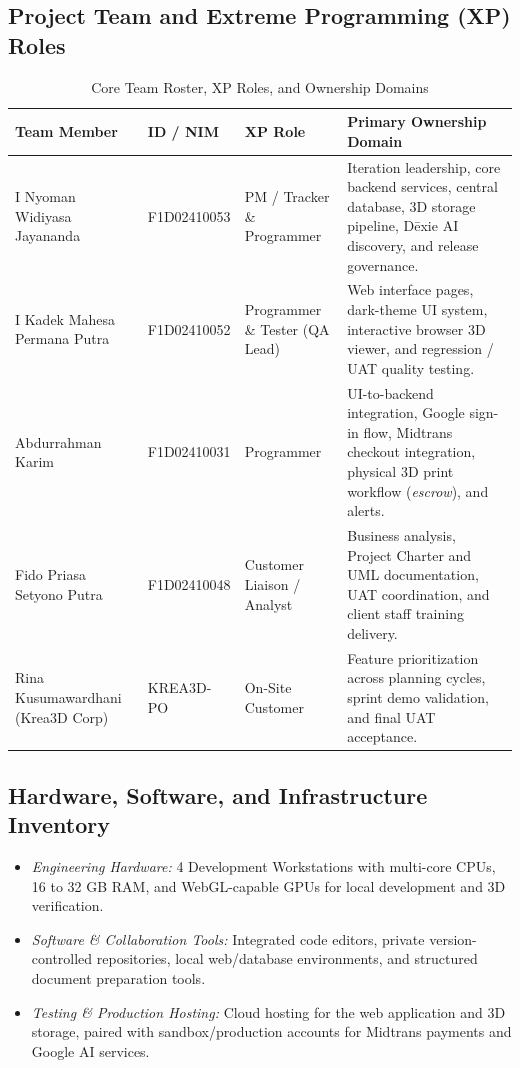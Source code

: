 \documentclass[11pt,a4paper]{article}
\newcommand{\thdr}[1]{\centering\arraybackslash\textbf{#1}}
\begin{document}
\subsection{Project Team and Extreme Programming (XP) Roles}

\begin{table}[H]
\centering
\caption{Core Team Roster, XP Roles, and Ownership Domains}
\begin{tabularx}{\textwidth}{| L{4.3cm} | C{2.3cm} | L{3.2cm} | Y |}
\hline
{} \thdr{Team Member} & \thdr{ID / NIM} & \thdr{XP Role} & \thdr{Primary Ownership Domain} \\
\hline
I Nyoman Widiyasa Jayananda & F1D02410053 & PM / Tracker \& Programmer & Iteration leadership, core backend services, central database, 3D storage pipeline, D\={e}xie AI discovery, and release governance. \\
\hline
I Kadek Mahesa Permana Putra & F1D02410052 & Programmer \& Tester (QA Lead) & Web interface pages, dark-theme UI system, interactive browser 3D viewer, and regression / UAT quality testing. \\
\hline
Abdurrahman Karim & F1D02410031 & Programmer & UI-to-backend integration, Google sign-in flow, Midtrans checkout integration, physical 3D print workflow (\textit{escrow}), and alerts. \\
\hline
Fido Priasa Setyono Putra & F1D02410048 & Customer Liaison / Analyst & Business analysis, Project Charter and UML documentation, UAT coordination, and client staff training delivery. \\
\hline
Rina Kusumawardhani (Krea3D Corp) & KREA3D-PO & On-Site Customer & Feature prioritization across planning cycles, sprint demo validation, and final UAT acceptance. \\
\hline
\end{tabularx}
\end{table}

\subsection{Hardware, Software, and Infrastructure Inventory}
\begin{itemize}[leftmargin=1.5em, itemsep=2pt]
    \item \textit{Engineering Hardware:} 4 Development Workstations with multi-core CPUs, 16 to 32 GB RAM, and WebGL-capable GPUs for local development and 3D verification.
    \item \textit{Software \& Collaboration Tools:} Integrated code editors, private version-controlled repositories, local web/database environments, and structured document preparation tools.
    \item \textit{Testing \& Production Hosting:} Cloud hosting for the web application and 3D storage, paired with sandbox/production accounts for Midtrans payments and Google AI services.
\end{itemize}
\end{document}

